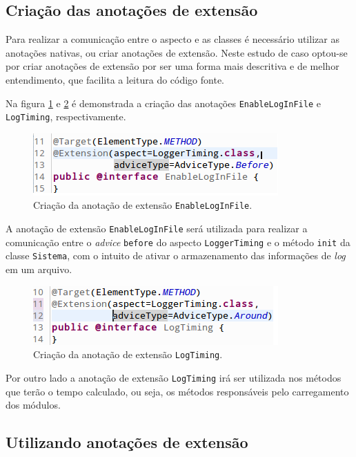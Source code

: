 \documentclass[tc,oneside]{iiufrgs}
\begin{document}
\subsection{Criação das anotações de extensão}

Para realizar a comunicação entre o aspecto e as classes é necessário utilizar as anotações nativas, ou criar anotações de extensão. Neste estudo de caso optou-se por criar anotações de extensão por ser uma forma mais descritiva e de melhor entendimento, que facilita a leitura do código fonte.

Na figura \ref{fig:extensionenablelog} e \ref{fig:extensionlogtiming} é demonstrada a criação das anotações \texttt{EnableLogInFile} e \texttt{LogTiming}, respectivamente.

\begin{figure}[ht]
	\centering
	\includegraphics[scale=0.6]{figuras/estudo/extensionenablelog.png}
	\caption{Criação da anotação de extensão \texttt{EnableLogInFile}.}
	\label{fig:extensionenablelog}
\end{figure}

A anotação de extensão \texttt{EnableLogInFile} será utilizada para realizar a comunicação entre o \textit{advice} \texttt{before} do aspecto \texttt{LoggerTiming} e o método \texttt{init} da classe \texttt{Sistema}, com o intuito de ativar o armazenamento das informações de \textit{log} em um arquivo.

\begin{figure}[ht]
	\centering
	\includegraphics[scale=0.6]{figuras/estudo/extensionlogtiming.png}
	\caption{Criação da anotação de extensão \texttt{LogTiming}.}
	\label{fig:extensionlogtiming}
\end{figure}

Por outro lado a anotação de extensão \texttt{LogTiming} irá ser utilizada nos métodos que terão o tempo calculado, ou seja, os métodos responsáveis pelo carregamento dos módulos.

\subsection{Utilizando anotações de extensão}
\end{document}
